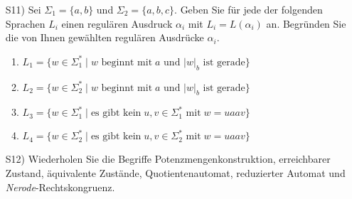 
\begin{exercise}
\begin{enumerate}
\item[S11)] Sei $\Sigma_1 = \{a,b\}$ und $\Sigma_2 =\{a,b,c\}$. Geben Sie für jede der folgenden Sprachen
  $L_i$ einen regulären Ausdruck $\alpha_i$ mit $L_i=L(\alpha_i)$ an. Begr\"unden
  Sie die von Ihnen gew\"ahlten regulären Ausdrücke $\alpha_i$.
  \begin{enumerate}
  \item $L_1 = \{ w\in \Sigma_1^* \mid w \text{ beginnt mit}\; a \text{ und }
    |w|_b \text{ ist gerade}\}$
  \item $L_2 = \{ w\in \Sigma_2^* \mid w \text{ beginnt mit}\; a \text{ und }
    |w|_b \text{ ist gerade}\}$
  \item $L_3 = \{ w\in \Sigma_1^* \mid \text{es gibt kein} \;u,v\in
    \Sigma_1^* \text{ mit} \;w=uaav\}$
  \item $L_4 = \{ w\in \Sigma_2^* \mid \text{es gibt kein} \;u,v\in \Sigma_2^* \text{ mit} \;w=uaav\}$

\end{enumerate}
\item[S12)] Wiederholen Sie die Begriffe Potenzmengenkonstruktion, erreichbarer Zustand, äquivalente Zustände, Quotientenautomat, reduzierter Automat und
  {\emph{Nerode}}-Rechtskongruenz.
\end{enumerate}

\end{exercise}
